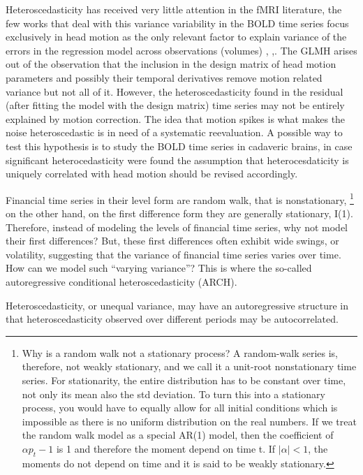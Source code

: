 \documentclass[10pt,letterpaper]{article}
\begin{document}
Heteroscedasticity has received very little attention in the fMRI literature, the few works that deal with this variance variability in the BOLD time series focus exclusively in head motion as the only relevant factor to explain variance of the errors in the regression model across observations (volumes) \citep{luo2003diagnosis}, \citep{diedrichsen2005detecting},\citep{eklund2017bayesian}. 
The GLMH arises out of the observation that the inclusion in the design matrix of head motion parameters and possibly their temporal derivatives remove motion related variance but not all of it. However, the heteroscedasticity found in the residual (after fitting the model with the design matrix) time series may not be entirely explained by motion correction. The idea that motion spikes is what makes the noise heteroscedastic is in need of a systematic reevaluation. A possible way to test this hypothesis is to study the BOLD time series in cadaveric brains, in case significant heterocedasticity were found the assumption that heterocesdaticity is uniquely correlated with head motion should be revised accordingly.

Financial time series in their level form are random walk, that is nonstationary, \footnote{Why is a random walk not a stationary process? A random-walk series is, therefore, not weakly stationary, and we call it a unit-root nonstationary time series. For stationarity, the entire distribution has to be constant over time, not only its mean also the std deviation. To turn this into a stationary process, you would have to equally allow for all initial conditions  which is impossible as there is no uniform distribution on the real numbers.  If we treat the random walk model as a special AR(1) model, then the coefficient of $\alpha p_t-1$ is 1 and therefore the moment depend on time t. If $|\alpha| < 1$, the moments do not depend on time and it is said to be weakly stationary.} on the other hand, on the first difference form they are generally stationary, I(1). Therefore, instead of modeling the levels of financial time series, why not model their first differences? But, these first differences often exhibit wide swings, or volatility, suggesting that the variance of financial time series varies over time. How can we model such “varying variance”? This is where the so-called autoregressive conditional heteroscedasticity (ARCH).

Heteroscedasticity, or unequal variance, may have an autoregressive structure in that heteroscedasticity observed over different periods may be autocorrelated. 
\end{document}
